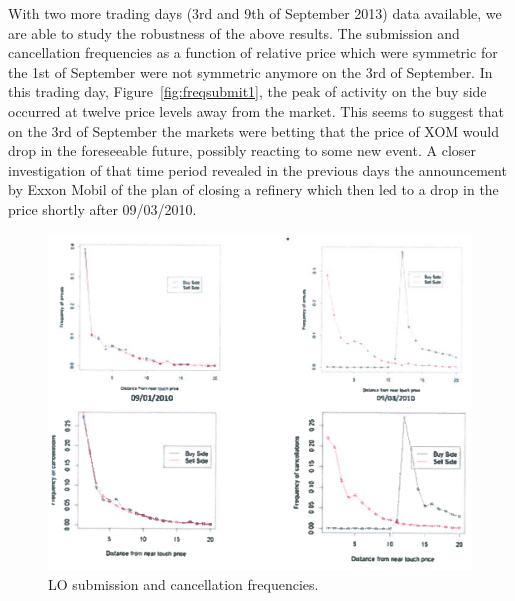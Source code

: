 With two more trading days (3rd and 9th of September 2013) data available, we are able to study the robustness of the above results. The submission and cancellation frequencies as a function of relative price which were symmetric for the 1st of September were not symmetric anymore on the 3rd of September. In this trading day, Figure~\ref{fig:freqsubmit1}, the peak of activity on the buy side occurred at twelve price levels away from the market. This seems to suggest that on the 3rd of September the markets were betting that the price of XOM would drop in the foreseeable future, possibly reacting to some new event. A closer investigation of that time period revealed in the previous days the announcement by Exxon Mobil of the plan of closing a refinery which then led to a drop in the price shortly after 09/03/2010.
	\begin{figure}[!ht]
   	\centering
   	\includegraphics[width=\textwidth]{chapters/chapter_trade_data_models/figures/losubcanfreq.png} 
   	\caption{LO submission and cancellation frequencies. \label{fig:losubcanfreq}}
	\end{figure}



